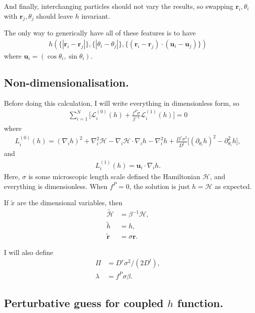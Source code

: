\documentclass{article}
\begin{document}
And finally, interchanging particles should not vary the results, so swapping $\bm{r}_i,\theta_i$
with $\bm{r}_j,\theta_j$ should leave $h$ invariant.

The only way to generically have all of these features is to have
\begin{align}
  h(\{|\bm{r}_i-\bm{r}_j|\},\{|\theta_i-\theta_j|\},
  \{(\bm{r}_i-\bm{r}_j)\cdot(\bm{u}_i-\bm{u}_j)\})
\end{align}
where $\bm{u}_i = (\cos\theta_i,\sin\theta_i)$.

\subsection{Non-dimensionalisation.}

Before doing this calculation, I will write everything in dimensionless form, so
\begin{align}\label{eq:dim_ss}
  \sum_{i=1}^N\big[\mathcal{L}_i^{(0)}(h)+ \frac{f^P\sigma}{\beta^{-1}}
  \mathcal{L}_i^{(1)}(h)\big] = 0
\end{align}
where
\begin{align}
  L_i^{(0)}(h)=(\nabla_i h)^2 + \nabla_i^2\mathcal{H}
  -\nabla_i\mathcal{H}\cdot\nabla_ih-\nabla_i^2h +\frac{D^r\sigma^2}{D^t}
  \big[(\partial_{\theta_i}h)^2-\partial_{\theta_i}^2h\big],
\end{align}
and
\begin{align}
  L_i^{(1)}(h)=\bm{u}_i\cdot\nabla_ih.
\end{align}
Here, $\sigma$ is some microscopic length scale defined the Hamiltonian
$\mathcal{H}$, and everything is dimensionless. When $f^P=0$, the solution
is just $h=\mathcal{H}$ as expected.

If $\tilde{x}$ are the dimensional variables, then
\begin{align}
  \tilde{\mathcal{H}} &= \beta^{-1}\mathcal{H},\\
  \tilde{h} &= h,\\
  \tilde{\bm{r}} &= \sigma\bm{r}.
\end{align}

I will also define
\begin{align}
  \Pi &= D^r\sigma^2/(2D^t),\\
  \lambda &= f^P\sigma\beta.
\end{align}
  
                        

\subsection{Perturbative guess for coupled $h$ function.}
\end{document}

